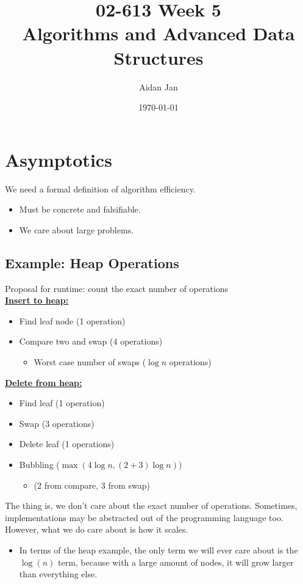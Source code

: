 \documentclass[10pt]{article}
\title{02-613 Week 5 \\ \large{Algorithms and Advanced Data Structures}}
\author{Aidan Jan}
\date{\today}
\begin{document}
\maketitle

\section*{Asymptotics}
We need a formal definition of algorithm efficiency.
\begin{itemize}
	\item Must be concrete and falsifiable.
	\item We care about large problems.
\end{itemize}

\subsection*{Example: Heap Operations}
Proposal for runtime: count the exact number of operations\\
\underline{\textbf{Insert to heap:}}
\begin{itemize}
	\item Find leaf node (1 operation)
	\item Compare two and swap (4 operations)
	\begin{itemize}
	    \item Worst case number of swaps ($\log n$ operations)
    \end{itemize}
\end{itemize}
\underline{\textbf{Delete from heap:}}
\begin{itemize}
	\item Find leaf (1 operation)
	\item Swap (3 operations)
	\item Delete leaf (1 operations)
	\item Bubbling ($\max(4 \log n, (2 + 3) \log n)$)
	\begin{itemize}
	    \item (2 from compare, 3 from swap)
    \end{itemize}
\end{itemize}
The thing is, we don't care about the exact number of operations.  Sometimes, implementations may be abstracted out of the programming language too.  However, what we do care about is how it scales.
\begin{itemize}
	\item In terms of the heap example, the only term we will ever care about is the $\log(n)$ term, because with a large amount of nodes, it will grow larger than everything else.
\end{itemize}
\end{document}
